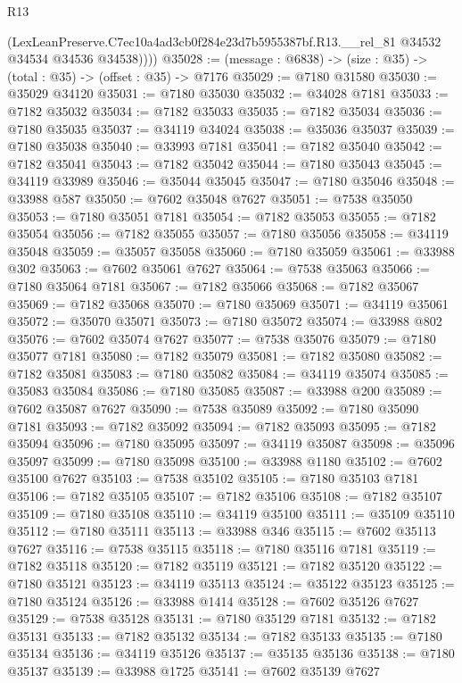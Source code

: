 \begin{lexlean}{R13}
\begin{coremodule}
          (LexLeanPreserve.C7ec10a4ad3cb0f284e23d7b5955387bf.R13.__rel_81
            @34532
            @34534
            @34536
            @34538))))
@35028 := (message : @6838) -> (size : @35) -> (total : @35) -> (offset : @35) -> @7176
@35029 := @7180 @31580
@35030 := @35029 @34120
@35031 := @7180 @35030
@35032 := @34028 @7181
@35033 := @7182 @35032
@35034 := @7182 @35033
@35035 := @7182 @35034
@35036 := @7180 @35035
@35037 := @34119 @34024
@35038 := @35036 @35037
@35039 := @7180 @35038
@35040 := @33993 @7181
@35041 := @7182 @35040
@35042 := @7182 @35041
@35043 := @7182 @35042
@35044 := @7180 @35043
@35045 := @34119 @33989
@35046 := @35044 @35045
@35047 := @7180 @35046
@35048 := @33988 @587
@35050 := @7602 @35048 @7627
@35051 := @7538 @35050
@35053 := @7180 @35051 @7181
@35054 := @7182 @35053
@35055 := @7182 @35054
@35056 := @7182 @35055
@35057 := @7180 @35056
@35058 := @34119 @35048
@35059 := @35057 @35058
@35060 := @7180 @35059
@35061 := @33988 @302
@35063 := @7602 @35061 @7627
@35064 := @7538 @35063
@35066 := @7180 @35064 @7181
@35067 := @7182 @35066
@35068 := @7182 @35067
@35069 := @7182 @35068
@35070 := @7180 @35069
@35071 := @34119 @35061
@35072 := @35070 @35071
@35073 := @7180 @35072
@35074 := @33988 @802
@35076 := @7602 @35074 @7627
@35077 := @7538 @35076
@35079 := @7180 @35077 @7181
@35080 := @7182 @35079
@35081 := @7182 @35080
@35082 := @7182 @35081
@35083 := @7180 @35082
@35084 := @34119 @35074
@35085 := @35083 @35084
@35086 := @7180 @35085
@35087 := @33988 @200
@35089 := @7602 @35087 @7627
@35090 := @7538 @35089
@35092 := @7180 @35090 @7181
@35093 := @7182 @35092
@35094 := @7182 @35093
@35095 := @7182 @35094
@35096 := @7180 @35095
@35097 := @34119 @35087
@35098 := @35096 @35097
@35099 := @7180 @35098
@35100 := @33988 @1180
@35102 := @7602 @35100 @7627
@35103 := @7538 @35102
@35105 := @7180 @35103 @7181
@35106 := @7182 @35105
@35107 := @7182 @35106
@35108 := @7182 @35107
@35109 := @7180 @35108
@35110 := @34119 @35100
@35111 := @35109 @35110
@35112 := @7180 @35111
@35113 := @33988 @346
@35115 := @7602 @35113 @7627
@35116 := @7538 @35115
@35118 := @7180 @35116 @7181
@35119 := @7182 @35118
@35120 := @7182 @35119
@35121 := @7182 @35120
@35122 := @7180 @35121
@35123 := @34119 @35113
@35124 := @35122 @35123
@35125 := @7180 @35124
@35126 := @33988 @1414
@35128 := @7602 @35126 @7627
@35129 := @7538 @35128
@35131 := @7180 @35129 @7181
@35132 := @7182 @35131
@35133 := @7182 @35132
@35134 := @7182 @35133
@35135 := @7180 @35134
@35136 := @34119 @35126
@35137 := @35135 @35136
@35138 := @7180 @35137
@35139 := @33988 @1725
@35141 := @7602 @35139 @7627

\end{coremodule}
\end{lexlean}
